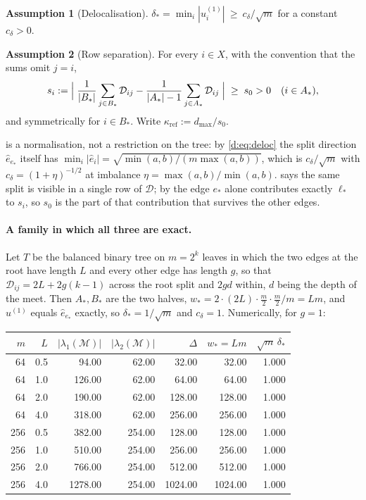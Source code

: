 \documentclass[11pt]{article}
\theoremstyle{plain}
\theoremstyle{definition}
\newtheorem{assumption}{Assumption}
\theoremstyle{remark}
\providecommand{\Dmat}{\mathcal{D}}          %
\providecommand{\Mop}{\mathcal{M}}           %
\providecommand{\uone}{u^{(1)}}
\providecommand{\1}{\mathbf{1}}
\newcommand{\dmax}{d_{\max}}
\newcommand{\est}{e_{*}}
\newcommand{\wst}{w_{*}}
\newcommand{\Ast}{A_{*}}
\newcommand{\Bst}{B_{*}}
\newcommand{\ehat}{\hat{e}}
\begin{document}
\begin{assumption}[Delocalisation]\label{d:asm:deloc}
$\delta_*=\min_i|\uone_i|\ \ge\ c_\delta/\sqrt{m}$ for a constant $c_\delta>0$.
\end{assumption}

\begin{assumption}[Row separation]\label{d:asm:rowsep}
For every $i\in X$, with the convention that the sums omit $j=i$,
\begin{equation}\label{d:eq:rowsep}
  s_i:=\Bigl|\;
    \frac{1}{|\Bst|}\sum_{j\in \Bst}\Dmat_{ij}
    -\frac{1}{|\Ast|-1}\sum_{j\in \Ast}\Dmat_{ij}\;\Bigr|
  \;\ge\;s_0>0
  \quad(i\in\Ast),
\end{equation}
and symmetrically for $i\in\Bst$. Write $\kappa_{\mathrm{ref}}:=\dmax/s_0$.
\end{assumption}

 is a normalisation, not a restriction on the tree: by
\eqref{d:eq:deloc} the split direction $\ehat_{\est}$ itself has
$\min_i|\ehat_i|=\sqrt{\min(a,b)/(m\max(a,b))}$, which is
$c_\delta/\sqrt m$ with $c_\delta=(1+\eta)^{-1/2}$ at imbalance
$\eta=\max(a,b)/\min(a,b)$.  says the same split is visible
in a single row of $\Dmat$; by  the edge $\est$ alone
contributes exactly $\ell_*$ to $s_i$, so $s_0$ is the part of that
contribution that survives the other edges.

\paragraph{A family in which all three are exact.}
Let $T$ be the balanced binary tree on $m=2^k$ leaves in which the two edges at
the root have length $L$ and every other edge has length $g$, so that
$\Dmat_{ij}=2L+2g(k-1)$ across the root split and $2gd$ within, $d$ being the
depth of the meet. Then $\Ast,\Bst$ are the two halves,
$\wst=2\cdot(2L)\cdot\tfrac{m}{2}\cdot\tfrac{m}{2}/m=Lm$, and $\uone$ equals
$\ehat_{\est}$ exactly, so $\delta_*=1/\sqrt m$ and $c_\delta=1$. Numerically,
for $g=1$:

\begin{center}
\begin{tabular}{rrrrrrr}
\toprule
$m$ & $L$ & $|\lambda_1(\Mop)|$ & $|\lambda_2(\Mop)|$ & $\Delta$ & $\wst=Lm$
    & $\sqrt m\,\delta_*$\\
\midrule
 64 & 0.5 &   94.00 &  62.00 &   32.00 &   32.00 & 1.000\\
 64 & 1.0 &  126.00 &  62.00 &   64.00 &   64.00 & 1.000\\
 64 & 2.0 &  190.00 &  62.00 &  128.00 &  128.00 & 1.000\\
 64 & 4.0 &  318.00 &  62.00 &  256.00 &  256.00 & 1.000\\
256 & 0.5 &  382.00 & 254.00 &  128.00 &  128.00 & 1.000\\
256 & 1.0 &  510.00 & 254.00 &  256.00 &  256.00 & 1.000\\
256 & 2.0 &  766.00 & 254.00 &  512.00 &  512.00 & 1.000\\
256 & 4.0 & 1278.00 & 254.00 & 1024.00 & 1024.00 & 1.000\\
\bottomrule
\end{tabular}
\end{center}
\end{document}
